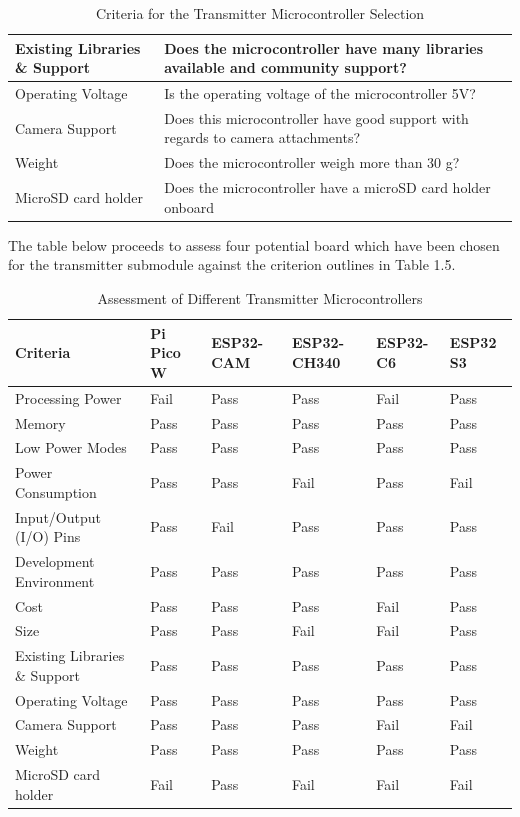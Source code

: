 \begin{table}[h]
\centering
\begin{tabular}{|l|p{10cm}|}
\hline
Existing Libraries \& Support & Does the microcontroller have many libraries available and community support? \\
\hline
Operating Voltage & Is the operating voltage of the microcontroller 5V? \\
\hline
Camera Support & Does this microcontroller have good support with regards to camera attachments? \\
\hline
Weight & Does the microcontroller weigh more than 30 g? \\
\hline
MicroSD card holder & Does the microcontroller have a microSD card holder onboard \\
\hline
\end{tabular}
\caption{Criteria for the Transmitter Microcontroller Selection}
\label{tab:microcontroller_criteria}
\end{table}

The table below proceeds to assess four potential board which have been chosen for the transmitter submodule against the criterion outlines in Table 1.5.

\begin{table}[h]
\centering
\begin{tabular}{|p{3.5cm}|l|l|l|l|l|}
\hline
\textbf{Criteria} & \textbf{Pi Pico W} & \textbf{ESP32-CAM} & \textbf{ESP32-CH340} & \textbf{ESP32-C6} & \textbf{ESP32 S3} \\
\hline
Processing Power & Fail & Pass & Pass & Fail & Pass \\
\hline
Memory & Pass & Pass & Pass & Pass & Pass \\
\hline
Low Power Modes & Pass & Pass & Pass & Pass & Pass \\
\hline
Power Consumption & Pass & Pass & Fail & Pass & Fail \\
\hline
Input/Output (I/O) Pins & Pass & Fail & Pass & Pass & Pass \\
\hline
Development Environment & Pass & Pass & Pass & Pass & Pass \\
\hline
Cost & Pass & Pass & Pass & Fail & Pass \\
\hline
Size & Pass & Pass & Fail & Fail & Pass \\
\hline
Existing Libraries \& Support & Pass & Pass & Pass & Pass & Pass \\
\hline
Operating Voltage & Pass & Pass & Pass & Pass & Pass \\
\hline
Camera Support & Pass & Pass & Pass & Fail & Fail \\
\hline
Weight & Pass & Pass & Pass & Pass & Pass \\
\hline
MicroSD card holder & Fail & Pass & Fail & Fail & Fail \\
\hline
\end{tabular}
\caption{Assessment of Different Transmitter Microcontrollers}
\label{tab:microcontroller_assessment}
\end{table}

